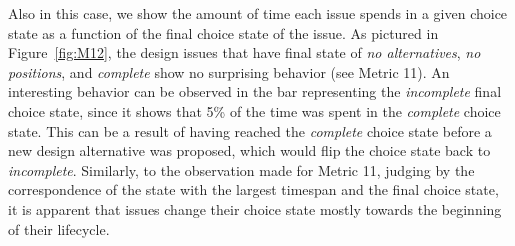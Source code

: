 \documentclass[article]{elsarticle}
\begin{document}
Also in this case, we show the amount of time each issue spends in a given choice state as a function of the final choice state of the issue.
As pictured in Figure~\ref{fig:M12}, the design issues that have final state of \emph{no alternatives}, \emph{no positions}, and \emph{complete} show no surprising behavior (see Metric 11). An interesting behavior can be observed in the bar representing the \emph{incomplete} final choice state, since it shows that 5\% of the time was spent in the \emph{complete} choice state. This can be a result of having reached the \emph{complete} choice state before a new design alternative was proposed, which would flip the choice state back to \emph{incomplete}. Similarly, to the observation made for Metric 11, judging by the correspondence of the state with the largest timespan and the final choice state, it is apparent that issues change their choice state mostly towards the beginning of their lifecycle. 
\end{document}

